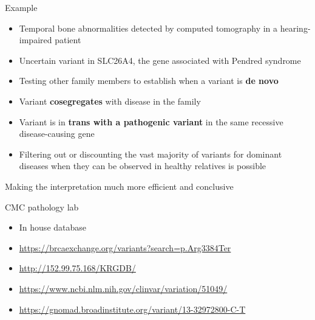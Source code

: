 \documentclass[
  ignorenonframetext,
]{beamer}
\providecommand{\tightlist}{%
  \setlength{\itemsep}{0pt}\setlength{\parskip}{0pt}}
\begin{document}
\begin{frame}{Example}
\protect\hypertarget{example}{}

\begin{itemize}
\tightlist
\item
  Temporal bone abnormalities detected by computed tomography in a
  hearing-impaired patient
\item
  Uncertain variant in SLC26A4, the gene associated with Pendred
  syndrome
\item
  Testing other family members to establish when a variant is \textbf{de
  novo}
\item
  Variant \textbf{cosegregates} with disease in the family
\item
  Variant is in \textbf{trans with a pathogenic variant} in the same
  recessive disease-causing gene
\item
  Filtering out or discounting the vast majority of variants for
  dominant diseases when they can be observed in healthy relatives is
  possible
\end{itemize}

Making the interpretation much more efficient and conclusive

\end{frame}

\begin{frame}{CMC pathology lab}
\protect\hypertarget{cmc-pathology-lab}{}

\begin{itemize}
\tightlist
\item
  In house database\\
\item
  \url{https://brcaexchange.org/variants?search=p.Arg3384Ter}
\item
  \url{http://152.99.75.168/KRGDB/}~\\
\item
  \url{https://www.ncbi.nlm.nih.gov/clinvar/variation/51049/}~\\
\item
  \url{https://gnomad.broadinstitute.org/variant/13-32972800-C-T}
\end{itemize}

\end{frame}
\end{document}
